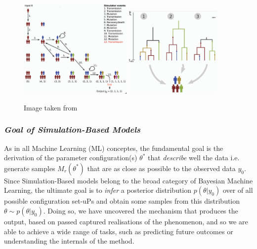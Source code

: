 \begin{figure}[!ht]
    \begin{center}
      \includegraphics[width=0.49\textwidth]{./images/chapter1/tuber_model_1.png}
      \includegraphics[width=0.42\textwidth]{./images/chapter1/tuber_model_2.png}
    \end{center}
    \caption{Image taken from \cite{Lintusaari2017}}
    \label{fig:tuberculosis_model}
\end{figure}

\subsubsection*{\textit{Goal of Simulation-Based Models}}

As in all Machine Learning (ML) conceptes, the fundamental goal is the
derivation of the parameter configuration(s) $\theta^*$ that
\textit{describe} well the data i.e. generate samples $M_r(\theta^*)$
that are as close as possible to the observed data $y_0$. Since
Simulation-Based models belong to the broad category of Bayesian
Machine Learning, the ultimate goal is to \textit{infer} a posterior
distribution $p(\theta|y_0)$ over of all possible configuration
set-uPs and obtain some samples from this distribution
$\theta \sim p(\theta|y_0)$. Doing so, we have uncovered the mechanism
that produces the output, based on passed captured realisations of the
phenomenon, and so we are able to achieve a wide range of tasks, such
as predicting future outcomes or understanding the internals of the
method.

